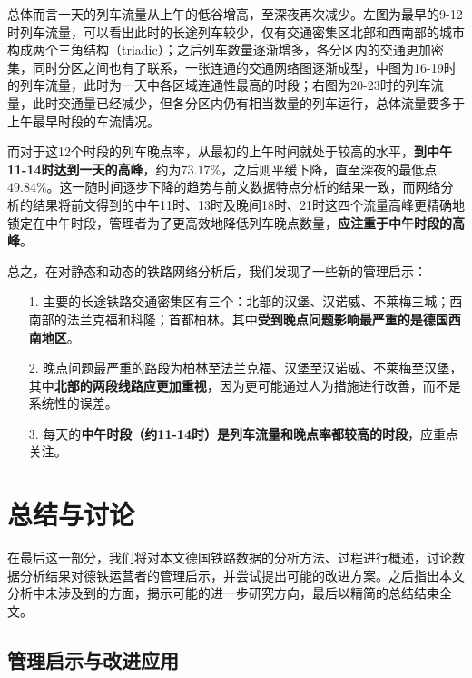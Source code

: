 \documentclass[lang=cn,12pt,a4paper,cite=authoryear]{elegantpaper}
\begin{document}
总体而言一天的列车流量从上午的低谷增高，至深夜再次减少。左图为最早的9-12时列车流量，可以看出此时的长途列车较少，仅有交通密集区北部和西南部的城市构成两个三角结构（triadic）；之后列车数量逐渐增多，各分区内的交通更加密集，同时分区之间也有了联系，一张连通的交通网络图逐渐成型，中图为16-19时的列车流量，此时为一天中各区域连通性最高的时段；右图为20-23时的列车流量，此时交通量已经减少，但各分区内仍有相当数量的列车运行，总体流量要多于上午最早时段的车流情况。

而对于这12个时段的列车晚点率，从最初的上午时间就处于较高的水平，\textbf{到中午11-14时达到一天的高峰}，约为$73.17\%$，之后则平缓下降，直至深夜的最低点$49.84\%$。这一随时间逐步下降的趋势与前文数据特点分析的结果一致，而网络分析的结果将前文得到的中午11时、13时及晚间18时、21时这四个流量高峰更精确地锁定在中午时段，管理者为了更高效地降低列车晚点数量，\textbf{应注重于中午时段的高峰}。

总之，在对静态和动态的铁路网络分析后，我们发现了一些新的管理启示：
\begin{itemize}
	\item[1.] 主要的长途铁路交通密集区有三个：北部的汉堡、汉诺威、不莱梅三城；西南部的法兰克福和科隆；首都柏林。其中\textbf{受到晚点问题影响最严重的是德国西南地区}。
	\item[2.] 晚点问题最严重的路段为柏林至法兰克福、汉堡至汉诺威、不莱梅至汉堡，其中\textbf{北部的两段线路应更加重视}，因为更可能通过人为措施进行改善，而不是系统性的误差。
	\item[3.] 每天的\textbf{中午时段（约11-14时）是列车流量和晚点率都较高的时段}，应重点关注。
\end{itemize}


\section{总结与讨论}

在最后这一部分，我们将对本文德国铁路数据的分析方法、过程进行概述，讨论数据分析结果对德铁运营者的管理启示，并尝试提出可能的改进方案。之后指出本文分析中未涉及到的方面，揭示可能的进一步研究方向，最后以精简的总结结束全文。

\subsection{管理启示与改进应用}
\end{document}
